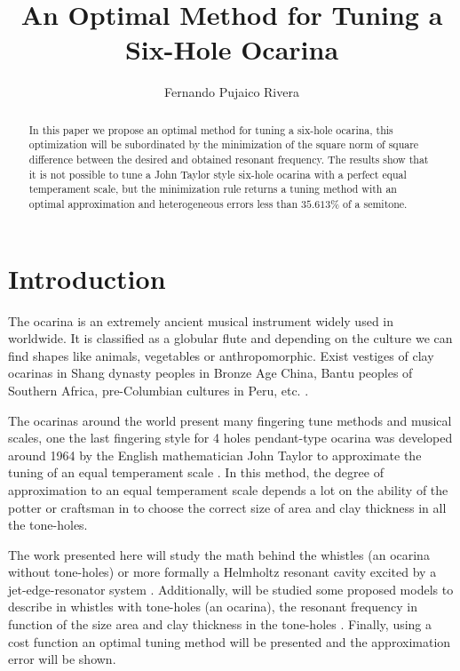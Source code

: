 \documentclass[11pt,twocolumn]{article}
\title{An Optimal Method for Tuning a Six-Hole Ocarina }
\author{Fernando Pujaico Rivera}
\date{ }
\begin{document}
\maketitle


\begin{abstract}
In this paper we propose an optimal method for tuning a six-hole ocarina,
this optimization will be subordinated by the minimization of 
the square norm of square difference between the desired and obtained resonant frequency.
The results show that it is not possible to tune a John Taylor style six-hole ocarina with a perfect equal temperament scale, 
but the minimization rule returns a tuning method with an optimal approximation and heterogeneous errors less than $35.613\%$ of a semitone.
\end{abstract}



\section{Introduction}
The ocarina is an extremely ancient musical instrument widely used in worldwide. 
It is classified as a globular flute and
depending on the culture we can find shapes like animals, vegetables or anthropomorphic.
Exist vestiges of clay ocarinas in 
Shang dynasty peoples in Bronze Age China, 
Bantu peoples of Southern Africa,
pre-Columbian cultures in Peru, etc.
\citep[pp. 589]{apel1969harvard} \citep[pp. 166-168]{sachs2012history} \citep[pp. 31]{leinweber2020art} \citep{rossi2020recuperacion}.

The ocarinas around the world present many fingering tune methods and musical scales,
one the last fingering style for 4 holes pendant-type ocarina was developed around 1964 
by the English mathematician John Taylor 
to approximate the tuning of an equal temperament scale 
\citep[pp. 79]{metropolitan1985american} \citep[pp. 10]{galpin2001newsletter}.
In this method, 
the degree of approximation to an equal temperament scale depends a lot on the ability of the potter or craftsman
in to choose the correct size of area and clay thickness in all the tone-holes.

The work presented here will study the math behind the whistles (an ocarina without tone-holes)  
or more formally a Helmholtz resonant cavity \citep{corning2011resonance} excited by a jet-edge-resonator system \citep[pp. 3]{gibiat2013acoustic} \citep[pp. 138]{nyborg1953characteristics}. 
Additionally, will be studied some proposed models to describe in whistles with tone-holes (an ocarina),
the resonant frequency in function of the size area and  clay thickness in the tone-holes 
\citep{mp2010ocarina} \citep[pp. 44]{cabreraestudio} \citep[pp. 16]{1999air}.
Finally, using a cost function an optimal tuning method will be presented 
and the approximation error will be shown. 
\end{document}
